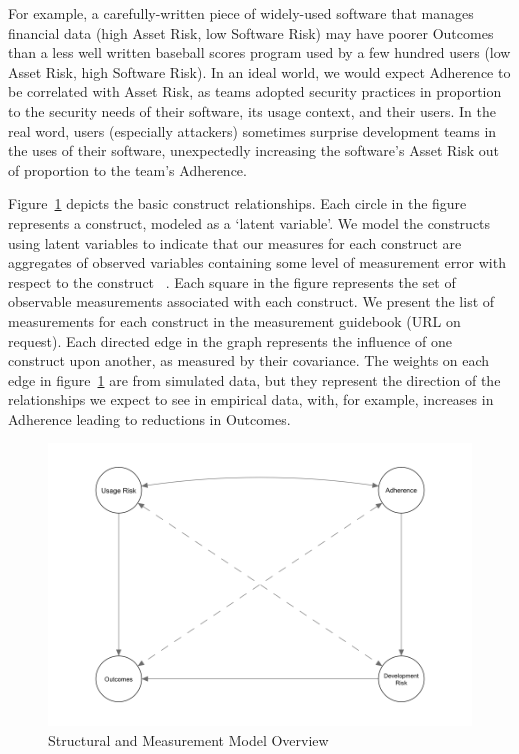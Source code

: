 For example, a carefully-written piece of widely-used software that manages financial data (high Asset Risk, low Software Risk) may have poorer Outcomes than a less well written baseball scores program used by a few hundred users (low Asset Risk, high Software Risk). In an ideal world, we would expect Adherence to be correlated with Asset Risk, as teams adopted security practices in proportion to the security needs of their software, its usage context, and their users. In the real word, users (especially attackers) sometimes surprise development teams in the uses of their software, unexpectedly increasing the software's Asset Risk out of proportion to the team's Adherence. 

Figure~\ref{fig:model_constructs} depicts the basic construct relationships. Each circle in the figure represents a construct, modeled as a `latent variable'. We model the constructs using latent variables to indicate that our measures for each construct are aggregates of observed variables containing some level of measurement error with respect to the construct ~\cite{kline2015principles,borsboom2008latent}. Each square in the figure represents the set of observable measurements associated with each construct. We present the list of measurements for each construct in the measurement guidebook (URL on request). Each directed edge in the graph represents the influence of one construct upon another, as measured by their covariance. The weights on each edge in figure~\ref{fig:model_constructs} are from simulated data, but they represent the direction of the relationships we expect to see in empirical data, with, for example, increases in Adherence leading to reductions in Outcomes. 

\begin{figure}
		\includegraphics[width=\columnwidth]{modelzeroB.png}
	\caption{Structural and Measurement Model Overview}
	\label{fig:model_constructs}
\end{figure}

